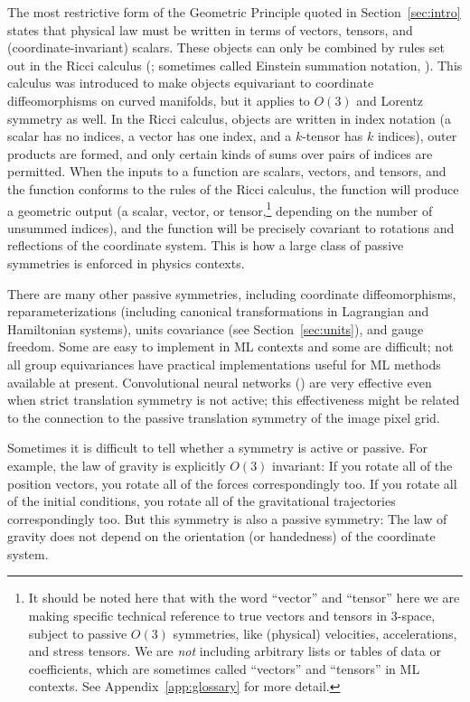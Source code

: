 \documentclass[]{article} %
\newcommand{\sectionname}{Section}
\newcommand{\secref}[1]{\sectionname~\ref{#1}}
\newcommand{\appref}[1]{Appendix~\ref{#1}}
\begin{document}
The most restrictive form of the Geometric Principle quoted in \secref{sec:intro} states that physical law must be written in terms of vectors, tensors, and (coordinate-invariant) scalars.
These objects can only be combined by rules set out in the Ricci calculus (\citealt{ricci}; sometimes called Einstein summation notation, \citealt{einstein}).
This calculus was introduced to make objects equivariant to coordinate diffeomorphisms on curved manifolds, but it applies to $O(3)$ and Lorentz symmetry as well.
In the Ricci calculus, objects are written in index notation (a scalar has no indices, a vector has one index, and a $k$-tensor has $k$ indices), outer products are formed, and only certain kinds of sums over pairs of indices are permitted.
When the inputs to a function are scalars, vectors, and tensors, and the function conforms to the rules of the Ricci calculus, the function will produce a geometric output (a scalar, vector, or tensor,\footnote{%
It should be noted here that with the word ``vector'' and ``tensor'' here we are making specific technical reference to true vectors and tensors in 3-space, subject to passive $O(3)$ symmetries, like (physical) velocities, accelerations, and stress tensors.
We are \emph{not} including arbitrary lists or tables of data or coefficients, which are sometimes called ``vectors'' and ``tensors'' in ML contexts. See \appref{app:glossary} for more detail.} depending on the number of unsummed indices), and the function will be precisely covariant to rotations and reflections of the coordinate system.
This is how a large class of passive symmetries is enforced in physics contexts.

There are many other passive symmetries, including coordinate diffeomorphisms, reparameterizations (including canonical transformations in Lagrangian and Hamiltonian systems), units covariance (see \secref{sec:units}), and gauge freedom.
Some are easy to implement in ML contexts and some are difficult;
not all group equivariances have practical implementations useful for ML methods available at present.
Convolutional neural networks (\citealt{lecun1989backpropagation}) are very effective even when strict translation symmetry is not active; this effectiveness might be related to the connection to the passive translation symmetry of the image pixel grid.

Sometimes it is difficult to tell whether a symmetry is active or passive.
For example, the law of gravity is explicitly $O(3)$ invariant:
If you rotate all of the position vectors, you rotate all of the forces correspondingly too.
If you rotate all of the initial conditions, you rotate all of the gravitational trajectories correspondingly too.
But this symmetry is also a passive symmetry:
The law of gravity does not depend on the orientation (or handedness) of the coordinate system.
\end{document}
